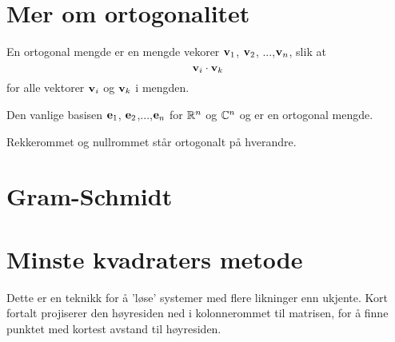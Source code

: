 \section*{Mer om ortogonalitet}
En ortogonal mengde er en mengde vekorer $\mathbf{v}_1$, $\mathbf{v}_2$, ...,$\mathbf{v}_n$, slik at
\[
\mathbf{v}_i \cdot \mathbf{v}_k
\]
for alle vektorer $\mathbf{v}_i$ og $\mathbf{v}_k$ i mengden. 
\begin{ex}
Den vanlige basisen $\mathbf{e}_1$, $\mathbf{e}_2$,...,$\mathbf{e}_n$ for $\mathbb{R}^n$ og $\mathbb{C}^n$ og  er en ortogonal mengde.
\end{ex}
\begin{ex}
Rekkerommet og nullrommet står ortogonalt på hverandre.
\end{ex}

\section*{Gram-Schmidt}


\section*{Minste kvadraters metode}
Dette er en teknikk for å 'løse' systemer med flere likninger enn ukjente. Kort fortalt projiserer den høyresiden ned i kolonnerommet til matrisen, for å finne punktet med kortest avstand til høyresiden.

\kapittelslutt

